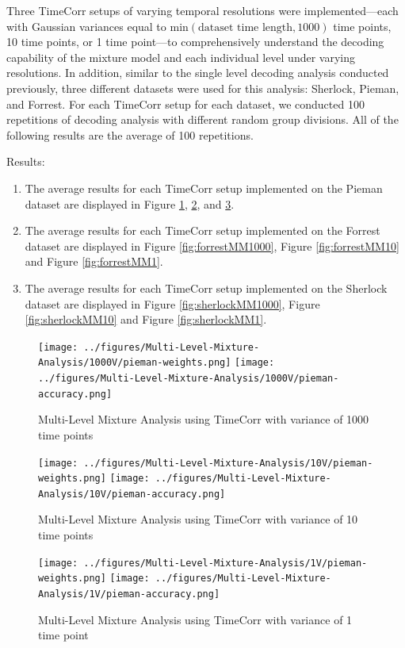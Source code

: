 \documentclass[11pt]{article}
\begin{document}
Three TimeCorr setups of varying temporal resolutions were implemented---each with Gaussian variances equal to $\text{min}(\text{dataset time length},1000)$ time points, 10 time points, or 1 time point---to comprehensively understand the decoding capability of the mixture model and each individual level under varying resolutions. In addition, similar to the single level decoding analysis conducted previously, three different datasets were used for this analysis: Sherlock, Pieman, and Forrest. For each TimeCorr setup for each dataset, we conducted 100 repetitions of decoding analysis with different random group divisions. All of the following results are the average of 100 repetitions.

Results:
\begin{enumerate}
\item The average results for each TimeCorr setup implemented on the Pieman dataset are displayed in Figure \ref{fig:piemanMM1000}, \ref{fig:piemanMM10}, and \ref{fig:piemanMM1}.
\item The average results for each TimeCorr setup implemented on the Forrest dataset are displayed in Figure \ref{fig:forrestMM1000}, Figure \ref{fig:forrestMM10} and Figure \ref{fig:forrestMM1}.
\item The average results for each TimeCorr setup implemented on the Sherlock dataset are displayed in Figure \ref{fig:sherlockMM1000}, Figure \ref{fig:sherlockMM10} and Figure \ref{fig:sherlockMM1}.
\end{enumerate}

\begin{figure}[!htb]
\caption{Multi-Level Mixture Analysis using TimeCorr with variance of 1000 time points}
\centering
\texttt{[image: ../figures/Multi-Level-Mixture-Analysis/1000V/pieman-weights.png]}
\texttt{[image: ../figures/Multi-Level-Mixture-Analysis/1000V/pieman-accuracy.png]}
\label{fig:piemanMM1000}
\end{figure}

\begin{figure}[!htb]
\caption{Multi-Level Mixture Analysis using TimeCorr with variance of 10 time points}
\centering
\texttt{[image: ../figures/Multi-Level-Mixture-Analysis/10V/pieman-weights.png]}
\texttt{[image: ../figures/Multi-Level-Mixture-Analysis/10V/pieman-accuracy.png]}
\label{fig:piemanMM10}
\end{figure}

\begin{figure}[!htb]
\caption{Multi-Level Mixture Analysis using TimeCorr with variance of 1 time point}
\centering
\texttt{[image: ../figures/Multi-Level-Mixture-Analysis/1V/pieman-weights.png]}
\texttt{[image: ../figures/Multi-Level-Mixture-Analysis/1V/pieman-accuracy.png]}
\label{fig:piemanMM1}
\end{figure}
\end{document}
